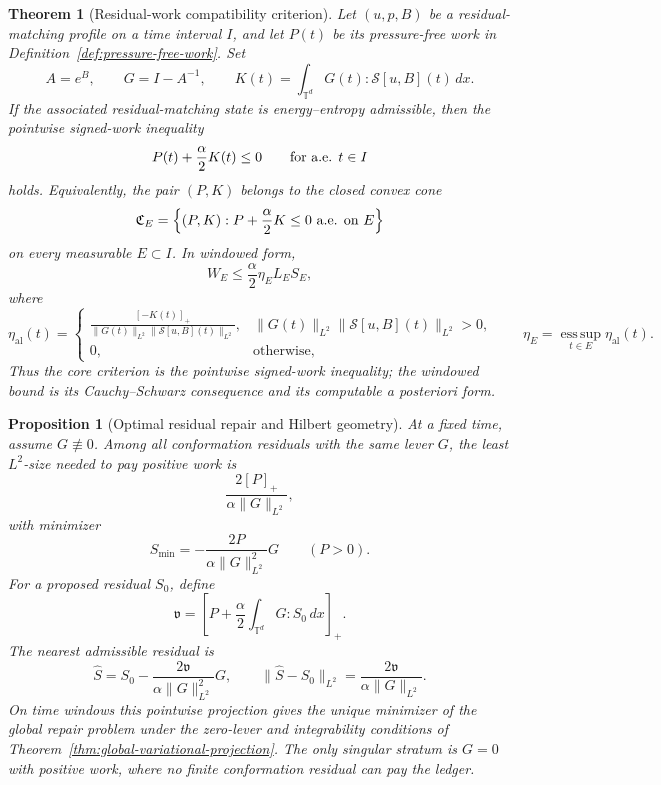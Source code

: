 \documentclass[11pt]{article}
\numberwithin{equation}{section}
\newtheorem{proposition}[theorem]{Proposition}
\newtheorem{maintheorem}{Theorem}
\begin{document}
\begin{maintheorem}[Residual-work compatibility criterion]
\label{thm:main-obstruction}
Let \((u,p,B)\) be a residual-matching profile on a time interval \(I\), and
let \(P(t)\) be its pressure-free work in
Definition~\ref{def:pressure-free-work}.  Set
\[
  A=e^B,\qquad G=I-A^{-1},\qquad
  K(t)=\int_{\mathbb T^d}G(t):\mathcal S[u,B](t)\,dx .
\]
If the associated residual-matching state is energy--entropy admissible, then
the pointwise signed-work inequality
\[
  P(t)+\frac{\alpha}{2}K(t)\le0
  \qquad\hbox{for a.e. }t\in I
\]
holds.  Equivalently, the pair \((P,K)\) belongs to the closed convex cone
\[
  \mathfrak C_E
  =
  \left\{(P,K):P+\frac{\alpha}{2}K\le0\hbox{ a.e. on }E\right\}
\]
on every measurable \(E\subset I\).  In windowed form,
\[
  W_E\le \frac{\alpha}{2}\eta_E L_ES_E,
\]
where
\[
  \eta_{\mathrm{al}}(t)=
  \begin{cases}
  \displaystyle
  \frac{\left[-K(t)\right]_+}
       {\|G(t)\|_{L^2}\|\mathcal S[u,B](t)\|_{L^2}},
  &\|G(t)\|_{L^2}\|\mathcal S[u,B](t)\|_{L^2}>0,\\[1.2em]
  0,&\text{otherwise},
  \end{cases}
  \qquad
  \eta_E=\operatorname*{ess\,sup}_{t\in E}\eta_{\mathrm{al}}(t).
\]
Thus the core criterion is the pointwise signed-work inequality; the windowed
bound is its Cauchy--Schwarz consequence and its computable a posteriori form.
\end{maintheorem}

\begin{proposition}[Optimal residual repair and Hilbert geometry]
\label{prop:intro-metric-repair}
At a fixed time, assume \(G\not\equiv0\).  Among all conformation residuals with
the same lever \(G\), the least \(L^2\)-size needed to pay positive work is
\[
  \frac{2[P]_+}{\alpha\|G\|_{L^2}},
\]
with minimizer
\[
  S_{\min}=
  -\frac{2P}{\alpha\|G\|_{L^2}^2}G
  \qquad(P>0).
\]
For a proposed residual \(S_0\), define
\[
  \mathfrak v=
  \left[P+\frac{\alpha}{2}\int_{\mathbb T^d}G:S_0\,dx\right]_+ .
\]
The nearest admissible residual is
\[
  \widehat S
  =
  S_0-\frac{2\mathfrak v}{\alpha\|G\|_{L^2}^2}G,
  \qquad
  \|\widehat S-S_0\|_{L^2}
  =
  \frac{2\mathfrak v}{\alpha\|G\|_{L^2}} .
\]
On time windows this pointwise projection gives the unique minimizer of the
global repair problem under the zero-lever and integrability conditions of
Theorem~\ref{thm:global-variational-projection}.  The only singular stratum is
\(G=0\) with positive work, where no finite conformation residual can pay the
ledger.
\end{proposition}
\end{document}
